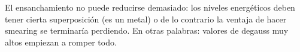 El ensanchamiento no puede reducirse demasiado: los niveles energéticos deben tener cierta superposición (es un metal) o de lo contrario la ventaja de hacer smearing se terminaría perdiendo. En otras palabras: valores de degauss muy altos empiezan a romper todo.

  \begin{figure}[H]
      \centering

\end{figure}
